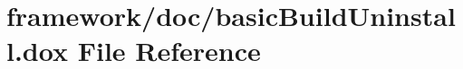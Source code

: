 \hypertarget{basic_build_uninstall_8dox}{}\section{framework/doc/basic\+Build\+Uninstall.dox File Reference}
\label{basic_build_uninstall_8dox}
